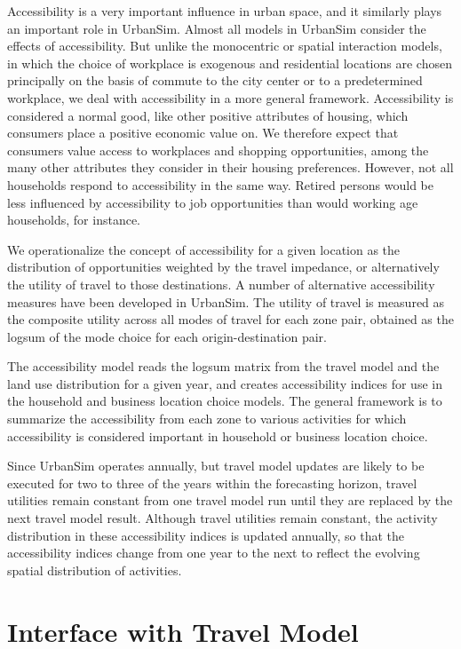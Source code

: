 Accessibility is a very important influence in urban space, and it
similarly plays an important role in UrbanSim.  Almost all models
in UrbanSim consider the effects of accessibility.  But unlike
the monocentric or spatial interaction models, in which the choice
of workplace is exogenous and
residential locations are chosen principally on the basis of
commute to the city center or to a predetermined workplace, we
deal with accessibility in a more general framework. Accessibility
is considered a normal good, like other positive attributes of
housing, which consumers place a positive economic value on.  We
therefore expect that consumers value access to workplaces and
shopping opportunities, among the many other attributes they
consider in their housing preferences. However, not all households
respond to accessibility in the same way. Retired persons would be
less influenced by accessibility to job opportunities than would
working age households, for instance.

We operationalize the concept of accessibility for a given
location as the distribution of opportunities weighted by the
travel impedance, or alternatively the utility of travel to those
destinations.  A number of alternative accessibility measures have
been developed in UrbanSim. The utility of travel is measured as the composite
utility across all modes of travel for each zone pair, obtained as
the logsum of the mode choice for each origin-destination pair.

The accessibility model reads the logsum matrix from the travel
model and the land use distribution for a given year, and creates
accessibility indices for use in the household and business
location choice models. The general framework is to summarize the
accessibility from each zone to various activities for which
accessibility is considered important in household or business
location choice.

Since UrbanSim operates annually, but travel model updates are
likely to be executed for two to three of the years within the
forecasting horizon, travel utilities remain constant from one
travel model run until they are replaced by the next travel model
result. Although travel utilities remain constant, the activity
distribution in these accessibility indices is updated annually,
so that the accessibility indices change from one year to the next
to reflect the evolving spatial distribution of activities.


\section{Interface with Travel Model}

